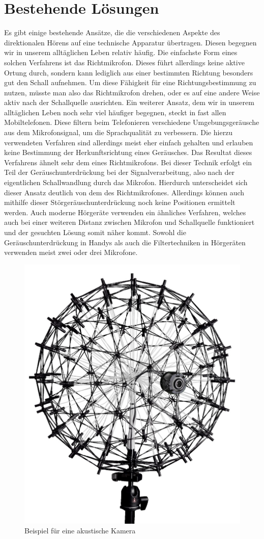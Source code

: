 \section{Bestehende Lösungen}
Es gibt einige bestehende Ansätze, die die verschiedenen Aspekte des direktionalen Hörens auf eine technische Apparatur übertragen. Diesen begegnen wir in unserem alltäglichen Leben relativ häufig. Die einfachste Form eines solchen Verfahrens ist das Richtmikrofon. Dieses führt allerdings keine aktive Ortung durch, sondern kann lediglich aus einer bestimmten Richtung besonders gut den Schall aufnehmen. Um diese Fähigkeit für eine Richtungsbestimmung zu nutzen, müsste man also das Richtmikrofon drehen, oder es auf eine andere Weise aktiv nach der Schallquelle ausrichten. Ein weiterer Ansatz, dem wir in unserem alltäglichen Leben noch sehr viel häufiger begegnen, steckt in fast allen Mobiltelefonen. Diese filtern beim Telefonieren verschiedene Umgebungsgeräusche aus dem Mikrofonsignal, um die Sprachqualität zu verbessern. Die hierzu verwendeten Verfahren sind allerdings meist eher einfach gehalten und erlauben keine Bestimmung der Herkunftsrichtung eines Geräusches. Das Resultat dieses Verfahrens ähnelt sehr dem eines Richtmikrofons. Bei dieser Technik erfolgt ein Teil der Geräuschunterdrückung bei der Signalverarbeitung, also nach der eigentlichen Schallwandlung durch das Mikrofon. Hierdurch unterscheidet sich dieser Ansatz deutlich von dem des Richtmikrofones. Allerdings können auch mithilfe dieser Störgeräuschunterdrückung noch keine Positionen ermittelt werden. Auch moderne Hörgeräte verwenden ein ähnliches Verfahren, welches auch bei einer weiteren Distanz zwischen Mikrofon und Schallquelle funktioniert und der gesuchten Lösung somit näher kommt. Sowohl die Geräuschunterdrückung in Handys als auch die Filtertechniken in Hörgeräten verwenden meist zwei oder drei Mikrofone.\\
\begin{figure}
    \centering
    \includegraphics[width=0.5\linewidth]{img/akusticCamera}
    \caption{Beispiel für eine akustische Kamera~\cite{camera}\label{fig:camera}}
\end{figure}
